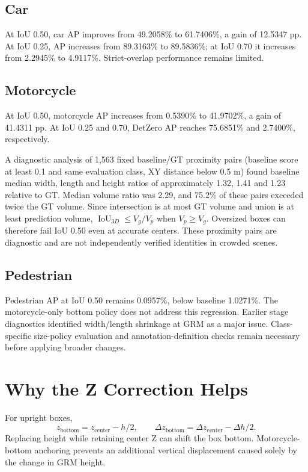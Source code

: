 \documentclass[a4paper,11pt]{article}
\begin{document}
\subsection{Car}
At IoU 0.50, car AP improves from 49.2058\% to 61.7406\%, a gain of 12.5347 pp. At IoU 0.25, AP increases from 89.3163\% to 89.5836\%; at IoU 0.70 it increases from 2.2945\% to 4.9117\%. Strict-overlap performance remains limited.

\subsection{Motorcycle}
At IoU 0.50, motorcycle AP increases from 0.5390\% to 41.9702\%, a gain of 41.4311 pp. At IoU 0.25 and 0.70, DetZero AP reaches 75.6851\% and 2.7400\%, respectively.

A diagnostic analysis of 1,563 fixed baseline/GT proximity pairs (baseline score at least 0.1 and same evaluation class, XY distance below 0.5 m) found baseline median width, length and height ratios of approximately 1.32, 1.41 and 1.23 relative to GT. Median volume ratio was 2.29, and 75.2\% of these pairs exceeded twice the GT volume. Since intersection is at most GT volume and union is at least prediction volume, $\operatorname{IoU}_{3D}\leq V_g/V_p$ when $V_p\geq V_g$. Oversized boxes can therefore fail IoU 0.50 even at accurate centers. These proximity pairs are diagnostic and are not independently verified identities in crowded scenes.

\subsection{Pedestrian}
Pedestrian AP at IoU 0.50 remains 0.0957\%, below baseline 1.0271\%. The motorcycle-only bottom policy does not address this regression. Earlier stage diagnostics identified width/length shrinkage at GRM as a major issue. Class-specific size-policy evaluation and annotation-definition checks remain necessary before applying broader changes.

\section{Why the Z Correction Helps}
For upright boxes,
\begin{equation}
z_{\mathrm{bottom}}=z_{\mathrm{center}}-h/2,\qquad
\Delta z_{\mathrm{bottom}}=\Delta z_{\mathrm{center}}-\Delta h/2.
\end{equation}
Replacing height while retaining center Z can shift the box bottom. Motorcycle-bottom anchoring prevents an additional vertical displacement caused solely by the change in GRM height.
\end{document}
